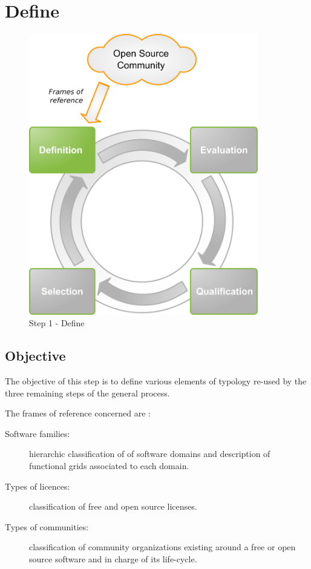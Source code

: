 %
\section{Define}
\begin{figure}
\center
\includegraphics[width=10cm]{images/definir}
\caption{Step 1 - Define}
\end{figure}


\subsection{Objective}
The objective of this step is to define various elements of typology re-used by the three 
remaining steps of the general process.


The frames of reference concerned are :
\begin{description}
\item [Software families:] hierarchic classification of of software domains and description of functional grids associated to each domain.
\item [Types of licences:] classification of free and open source licenses.
\item [Types of communities:] classification of community organizations existing around a free or open source software and in charge of its life-cycle.
\end{description}


